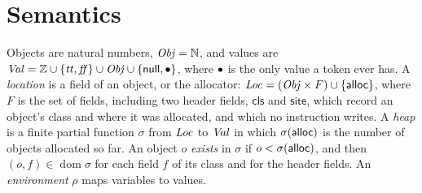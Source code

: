 \section{Semantics}\label{sec:ee-semantics}

\begin{definition}[Heaps]\label{def:ee-heaps}
Objects are natural numbers, $\mathit{Obj} = \mathbb{N}$, and values are
$\mathit{Val} = \mathbb{Z} \cup \{\mathit{tt}, \mathit{ff}\} \cup \mathit{Obj} \cup \{\mathsf{null}, \bullet\}$,
where $\bullet$ is the only value a token ever has. A \emph{location} is a field of
an object, or the allocator: $\mathit{Loc} = (\mathit{Obj} \times F) \cup \{\mathsf{alloc}\}$, where $F$
is the set of fields, including two header fields, $\mathsf{cls}$ and
$\mathsf{site}$, which record an object's class and where it was allocated,
and which no instruction writes. A \emph{heap} is a finite partial function
$\sigma$ from $\mathit{Loc}$ to $\mathit{Val}$ in which $\sigma(\mathsf{alloc})$ is the number of
objects allocated so far. An object $o$ \emph{exists} in $\sigma$ if
$o < \sigma(\mathsf{alloc})$, and then $(o, f) \in \operatorname{dom} \sigma$ for each
field $f$ of its class and for the header fields. An \emph{environment} $\rho$
maps variables to values.
\end{definition}


